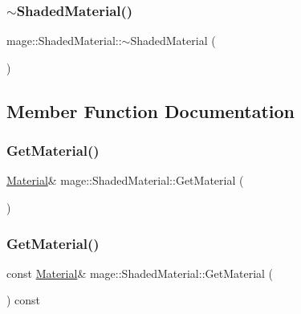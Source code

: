 \subsubsection{\texorpdfstring{$\sim$\+Shaded\+Material()}{~ShadedMaterial()}}
{\footnotesize\ttfamily mage\+::\+Shaded\+Material\+::$\sim$\+Shaded\+Material (\begin{DoxyParamCaption}{ }\end{DoxyParamCaption})\hspace{0.3cm}{\ttfamily [default]}}



\subsection{Member Function Documentation}
\hypertarget{structmage_1_1_shaded_material_a785d01e0156c6aba84d479917b62ab03}{}\label{structmage_1_1_shaded_material_a785d01e0156c6aba84d479917b62ab03} 
\subsubsection{\texorpdfstring{Get\+Material()}{GetMaterial()}\hspace{0.1cm}{\footnotesize\ttfamily [1/2]}}
{\footnotesize\ttfamily \hyperlink{structmage_1_1_material}{Material}\& mage\+::\+Shaded\+Material\+::\+Get\+Material (\begin{DoxyParamCaption}{ }\end{DoxyParamCaption})}

\hypertarget{structmage_1_1_shaded_material_a936a1cb2c79b28818814ac504d059ea3}{}\label{structmage_1_1_shaded_material_a936a1cb2c79b28818814ac504d059ea3} 
\subsubsection{\texorpdfstring{Get\+Material()}{GetMaterial()}\hspace{0.1cm}{\footnotesize\ttfamily [2/2]}}
{\footnotesize\ttfamily const \hyperlink{structmage_1_1_material}{Material}\& mage\+::\+Shaded\+Material\+::\+Get\+Material (\begin{DoxyParamCaption}{ }\end{DoxyParamCaption}) const}

